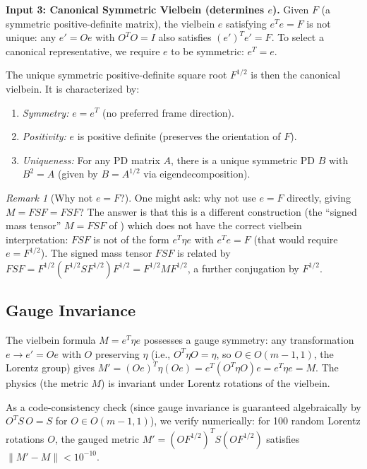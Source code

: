 \documentclass[11pt]{article}
\theoremstyle{definition}
\theoremstyle{remark}
\newtheorem{remark}[theorem]{Remark}
\newcommand{\Fish}{F}
\newcommand{\sgn}{S}
\newcommand{\Met}{M}
\begin{document}
\medskip\noindent
\textbf{Input 3: Canonical Symmetric Vielbein (determines $e$).}
Given $\Fish$ (a symmetric positive-definite matrix), the vielbein
$e$ satisfying $e^T e = \Fish$ is not unique: any $e' = Oe$ with
$O^T O = I$ also satisfies $(e')^T e' = \Fish$. To select a canonical
representative, we require $e$ to be symmetric: $e^T = e$.

The unique symmetric positive-definite square root $\Fish^{1/2}$ is
then the canonical vielbein. It is characterized by:
\begin{enumerate}
\item \textit{Symmetry:} $e = e^T$ (no preferred frame direction).
\item \textit{Positivity:} $e$ is positive definite (preserves the
  orientation of $\Fish$).
\item \textit{Uniqueness:} For any PD matrix $A$, there is a unique
  symmetric PD $B$ with $B^2 = A$ (given by $B = A^{1/2}$ via
  eigendecomposition).
\end{enumerate}

\begin{remark}[Why not $e = \Fish$?]
One might ask: why not use $e = \Fish$ directly, giving
$\Met = \Fish \sgn \Fish = FSF$? The answer is that this is a different
construction (the ``signed mass tensor'' $M = FSF$ of \cite{Paper1})
which does not have the correct vielbein interpretation: $FSF$ is not
of the form $e^T \eta e$ with $e^T e = \Fish$ (that would require $e = \Fish^{1/2}$).
The signed mass tensor $FSF$ is related by $FSF = F^{1/2}(F^{1/2}SF^{1/2})F^{1/2}
= F^{1/2} \Met F^{1/2}$, a further conjugation by $F^{1/2}$.
\end{remark}

\subsection{Gauge Invariance}
\label{subsec:gauge-invariance}

The vielbein formula $\Met = e^T \eta e$ possesses a gauge symmetry:
any transformation $e \to e' = Oe$ with $O$ preserving $\eta$
(i.e., $O^T \eta O = \eta$, so $O \in O(m-1, 1)$, the Lorentz group)
gives $\Met' = (Oe)^T \eta (Oe) = e^T (O^T \eta O) e = e^T \eta e = \Met$.
The physics (the metric $\Met$) is invariant under Lorentz rotations of
the vielbein.

As a code-consistency check (since gauge invariance is guaranteed
algebraically by $O^T \sgn\, O = \sgn$ for $O \in O(m{-}1, 1)$),
we verify numerically: for 100 random Lorentz rotations $O$, the
gauged metric $\Met' = (O\Fish^{1/2})^T \sgn (O\Fish^{1/2})$
satisfies $\|\Met' - \Met\| < 10^{-10}$.
\end{document}
